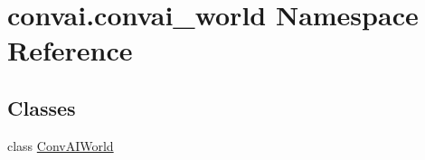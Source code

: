 \hypertarget{namespaceconvai_1_1convai__world}{}\section{convai.\+convai\+\_\+world Namespace Reference}
\label{namespaceconvai_1_1convai__world}
\subsection*{Classes}
\begin{DoxyCompactItemize}
\item 
class \hyperlink{classconvai_1_1convai__world_1_1ConvAIWorld}{Conv\+A\+I\+World}
\end{DoxyCompactItemize}
